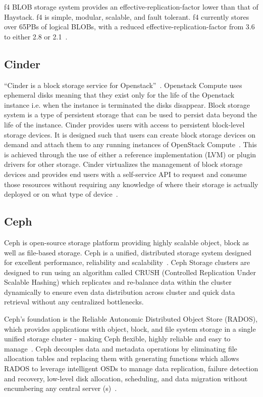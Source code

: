      f4 BLOB storage system provides an effective-replication-factor
     lower than that of Haystack. f4 is simple, modular, scalable, and
     fault tolerant. f4 currently stores over 65PBs of logical BLOBs,
     with a reduced effective-replication-factor from 3.6 to either
     2.8 or 2.1~\cite{paper-f4}.

     
\subsection{Cinder}
      
``Cinder is a block storage service for
Openstack''~\cite{wiki-Cinder}. Openstack Compute uses ephemeral disks
meaning that they exist only for the life of the Openstack instance
i.e. when the instance is terminated the disks disappear. Block
storage system is a type of persistent storage that can be used to
persist data beyond the life of the instance. Cinder provides users
with access to persistent block-level storage devices. It is designed
such that users can create block storage devices on demand and attach
them to any running instances of OpenStack
Compute~\cite{book-Cinder}. This is achieved through the use of either
a reference implementation (LVM) or plugin drivers for other
storage. Cinder virtualizes the management of block storage devices
and provides end users with a self-service API to request and consume
those resources without requiring any knowledge of where their storage
is actually deployed or on what type of device~\cite{wiki-Cinder}.
     
\subsection{Ceph }

Ceph is open-source storage platform providing highly scalable object,
block as well as file-based storage. Ceph is a unified, distributed
storage system designed for excellent performance, reliability and
scalability~\cite{www-ceph}. Ceph Storage clusters are designed to run
using an algorithm called CRUSH (Controlled Replication Under Scalable
Hashing) which replicates and re-balance data within the cluster
dynamically to ensure even data distribution across cluster and quick
data retrieval without any centralized bottlenecks.
 
Ceph's foundation is the Reliable Autonomic Distributed Object Store
(RADOS), which provides applications with object, block, and file
system storage in a single unified storage cluster - making Ceph
flexible, highly reliable and easy to manage~\cite{www-cepharch}. Ceph
decouples data and metadata operations by eliminating file allocation
tables and replacing them with generating functions which allows RADOS
to leverage intelligent OSDs to manage data replication, failure
detection and recovery, low-level disk allocation, scheduling, and
data migration without encumbering any central server
(s)~\cite{paper-Ceph}.
 

